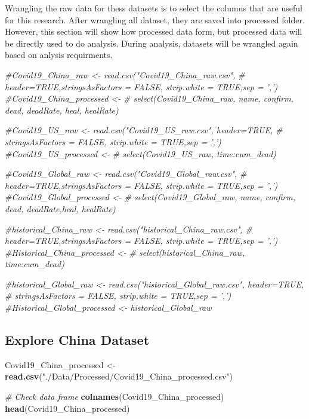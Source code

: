 \documentclass[12pt,]{article}
\newenvironment{Shaded}{\begin{snugshade}}{\end{snugshade}}
\newcommand{\CommentTok}[1]{\textcolor[rgb]{0.56,0.35,0.01}{\textit{#1}}}
\newcommand{\KeywordTok}[1]{\textcolor[rgb]{0.13,0.29,0.53}{\textbf{#1}}}
\newcommand{\NormalTok}[1]{#1}
\newcommand{\StringTok}[1]{\textcolor[rgb]{0.31,0.60,0.02}{#1}}
\begin{document}
Wrangling the raw data for thess datasets is to select the columns that
are useful for this research. After wrangling all dataset, they are
saved into processed folder. However, this section will show how
processed data form, but processed data will be directly used to do
analysis. During analysis, datasets will be wrangled again based on
anlysis requirments.

\begin{Shaded}
\begin{Highlighting}[]
\CommentTok{#Covid19_China_raw <- read.csv("Covid19_China_raw.csv",}
\CommentTok{#                     header=TRUE,stringsAsFactors = FALSE, strip.white = TRUE,sep = ',')}
\CommentTok{#Covid19_China_processed <- }
\CommentTok{#  select(Covid19_China_raw, name, confirm, dead, deadRate, heal, healRate)}


\CommentTok{#Covid19_US_raw <- read.csv("Covid19_US_raw.csv", header=TRUE,}
\CommentTok{#                  stringsAsFactors = FALSE, strip.white = TRUE,sep = ',')}
\CommentTok{#Covid19_US_processed <- }
\CommentTok{#  select(Covid19_US_raw, time:cum_dead)}


\CommentTok{#Covid19_Global_raw <- read.csv("Covid19_Global_raw.csv",}
\CommentTok{#                      header=TRUE,stringsAsFactors = FALSE, strip.white = TRUE,sep = ',')}
\CommentTok{#Covid19_Global_processed <- }
\CommentTok{#  select(Covid19_Global_raw, name, confirm, dead, deadRate,heal, healRate)}


\CommentTok{#historical_China_raw <- read.csv("historical_China_raw.csv",}
\CommentTok{#                        header=TRUE,stringsAsFactors = FALSE, strip.white = TRUE,sep = ',')}
\CommentTok{#Historical_China_processed <- }
\CommentTok{#  select(historical_China_raw, time:cum_dead)}


\CommentTok{#historical_Global_raw <- read.csv("historical_Global_raw.csv", header=TRUE, }
\CommentTok{#                                  stringsAsFactors = FALSE, strip.white = TRUE,sep = ',')}
\CommentTok{#Historical_Global_processed <- historical_Global_raw}
\end{Highlighting}
\end{Shaded}

\hypertarget{explore-china-dataset}{%
\subsection{Explore China Dataset}\label{explore-china-dataset}}

\begin{Shaded}
\begin{Highlighting}[]
\NormalTok{Covid19_China_processed <-}\StringTok{ }\KeywordTok{read.csv}\NormalTok{(}\StringTok{"./Data/Processed/Covid19_China_processed.csv"}\NormalTok{)}

\CommentTok{# Check data frame}
\KeywordTok{colnames}\NormalTok{(Covid19_China_processed)}
\KeywordTok{head}\NormalTok{(Covid19_China_processed)}
\end{Highlighting}
\end{Shaded}
\end{document}
